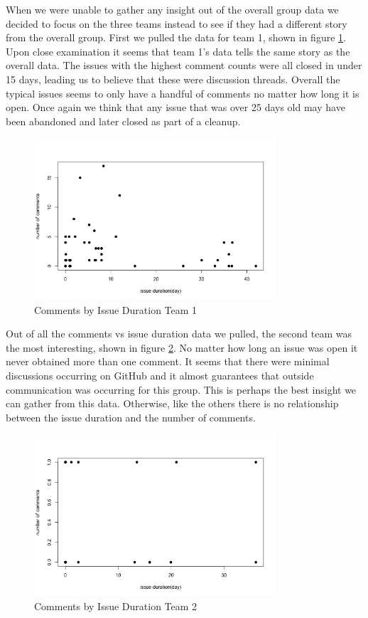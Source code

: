 \documentclass[conference]{IEEEtran}
\begin{document}
When we were unable to gather any insight out of the overall group data we decided to focus on the three teams instead to see if they had a different story from the overall group. First we pulled the data for team 1, shown in figure \ref{comments_duration_1}. Upon close examination it seems that team 1's data tells the same story as the overall data. The issues with the highest comment counts were all closed in under 15 days, leading us to believe that these were discussion threads. Overall the typical issues seems to only have a handful of comments no matter how long it is open. Once again we think that any issue that was over 25 days old may have been abandoned and later closed as part of a cleanup. 

\begin{figure}[H]
    \centering
    \includegraphics[width=9cm]{../AprilProject/pic/comments_and_issue_duration1.png}
    \caption{Comments by Issue Duration Team 1}
    \label{comments_duration_1}
\end{figure}

Out of all the comments vs issue duration data we pulled, the second team was the most interesting, shown in figure \ref{comments_duration_2}. No matter how long an issue was open it never obtained more than one comment. It seems that there were minimal discussions occurring on GitHub and it almost guarantees that outside communication was occurring for this group. This is perhaps the best insight we can gather from this data. Otherwise, like the others there is no relationship between the issue duration and the number of comments. 

\begin{figure}[H]
    \centering
    \includegraphics[width=9cm]{../AprilProject/pic/comments_and_issue_duration2.png}
    \caption{Comments by Issue Duration Team 2}
    \label{comments_duration_2}
\end{figure}
\end{document}
